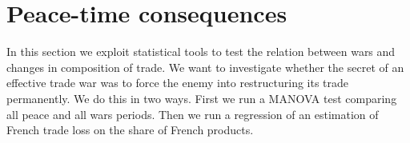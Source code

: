 \documentclass[12pt,a4paper,notitlepage,english]{article}
\begin{document}


\section{Peace-time consequences} \label{sec:empirical_analysis}
In this section we exploit statistical tools to test the relation between wars and changes in composition of trade. We want to investigate whether the secret of an effective trade war was to force the enemy into restructuring its trade permanently. We do this in two ways. First we run a MANOVA test comparing all peace and all wars periods. Then we run a regression of an estimation of French trade loss on the share of French products.
\end{document}
